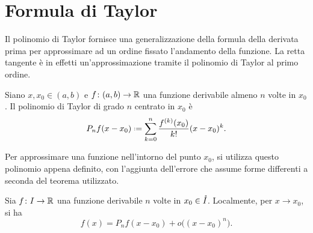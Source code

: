 \section{Formula di Taylor}
Il polinomio di Taylor fornisce una generalizzazione della formula della derivata prima per approssimare ad un ordine fissato l'andamento della funzione. La retta tangente è in effetti un'approssimazione tramite il polinomio di Taylor al primo ordine.
\begin{definizione}
\label{d:taylor}
Siano $x,x_0\in(a,b)$ e $f\colon(a,b)\to\mathbb{R}$ una funzione derivabile almeno $n$ volte in $x_0$. Il polinomio di Taylor di grado $n$ centrato in $x_0$ è
\begin{equation}
\label{eq:taylor}
P_nf(x-x_0)\defeq %
\sum_{k=0}^n\frac{f^{(k)}(x_0)}{k!}(x-x_0)^k.
\end{equation}
\end{definizione}
Per approssimare una funzione nell'intorno del punto $x_0$, si utilizza questo polinomio appena definito, con l'aggiunta dell'errore che assume forme differenti a seconda del teorema utilizzato.
\begin{teorema}
\label{t:taylor_peano}
Sia $f\colon I\to\mathbb{R}$ una funzione derivabile $n$ volte in $x_0\in\mathring{I}$. Localmente, per $x\to x_0$, si ha
\begin{equation}
\label{eq:taylor_peano}
f(x)=P_nf(x-x_0)+o\big((x-x_0)^n\big).
\end{equation}
\end{teorema}
